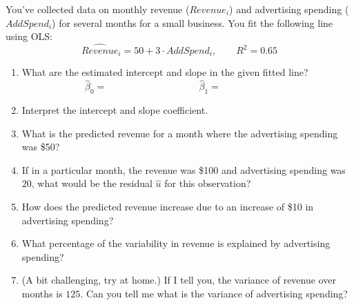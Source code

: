 \documentclass{./../../Latex/handout}
\begin{document}
You've collected data on monthly revenue ($Revenue_i$) and advertising spending ($AddSpend_i$) for several months for a small business. You fit the following line using OLS: 
\[ \hat{Revenue}_i = 50 + 3 \cdot AddSpend_i, \quad \quad R^2 =0.65 \]
\begin{enumerate}
    \item What are the estimated intercept and slope in the given fitted line?
    $$\hat{\beta}_0 =  \hspace{4cm} \hat{\beta}_1 = \hspace{3cm} $$
    \item Interpret the intercept and slope coefficient.
    \vspace{2.5cm}
    \item What is the predicted revenue for a month where the advertising spending was \$50?
    \vspace{1cm}     
    \item  If in a particular month, the revenue was \$100 and advertising spending was $20$, what would be the residual \( \hat{u} \) for this observation? \vspace{1.5cm}
    \item  How does the predicted revenue increase due to an increase of \$10 in advertising spending? \vspace{1.5cm}
        
    \item  What percentage of the variability in revenue is explained by advertising spending? \vspace{1cm}
    \item (A bit challenging, try at home.) If I tell you, the variance of revenue over months is $125$. Can you tell me what is the variance of advertising spending? 
    \end{enumerate}
\end{document}
